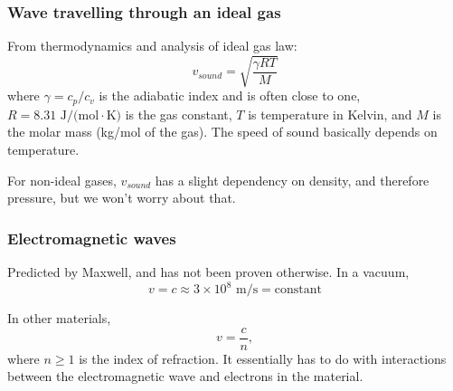 \subsubsection{Wave travelling through an ideal gas}
From thermodynamics and analysis of ideal gas law:
$$v_{sound}=\sqrt{\frac{\gamma RT}{M}}$$
where $\gamma=c_p/c_v$ is the adiabatic index and is often close to one, $R=8.31\mbox{ J/(mol}\cdot\mbox{K)}$ is the gas constant, $T$ is temperature in Kelvin, and $M$ is the molar mass (kg/mol of the gas). The speed of sound basically depends on temperature.

For non-ideal gases, $v_{sound}$ has a slight dependency on density, and therefore pressure, but we won't worry about that.

\subsubsection{Electromagnetic waves}
Predicted by Maxwell, and has not been proven otherwise. 
In a vacuum,
$$v=c\approx 3\times 10^8\mbox{ m/s}=\mbox{constant}$$

In other materials, 
$$v=\frac{c}{n},$$
where $n\geq 1$ is the index of refraction. It essentially has to do with interactions between the electromagnetic wave and electrons in the material.



\clearpage
